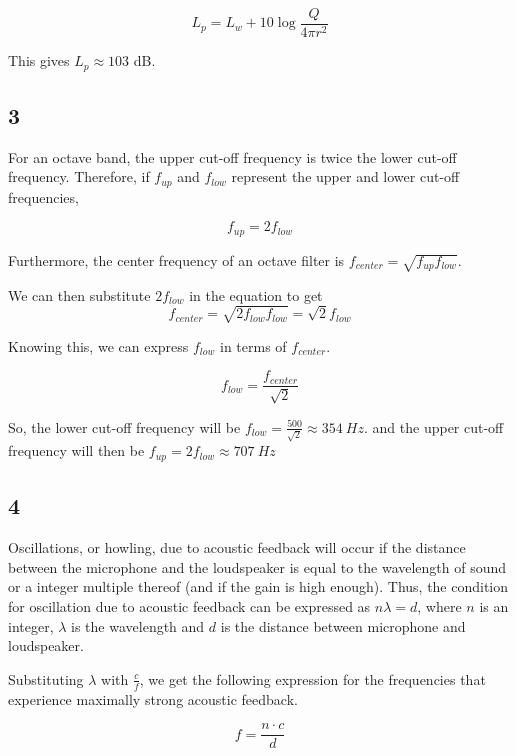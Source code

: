 \documentclass{article}
\begin{document}
\begin{equation}
    L_p = L_w + 10 \log{\frac{Q}{4 \pi r^2}}
\end{equation}

This gives $L_p \approx 103 $ dB.


\subsection*{3}

For an octave band, the upper cut-off frequency is twice the lower cut-off frequency. Therefore, if $f_{up}$ and $f_{low}$ represent the upper and lower cut-off frequencies,

\begin{equation}
    f_{up} = 2 f_{low}
\end{equation}

Furthermore, the center frequency of an octave filter is $f_{center}=\sqrt{f_{up}f_{low}}$.

We can then substitute $2f_{low}$ in the equation to get $$f_{center}=\sqrt{2f_{low}f_{low}}=\sqrt{2}f_{low}$$

Knowing this, we can express $f_{low}$ in terms of $f_{center}$.

\begin{equation}
    f_{low} = \frac{f_{center}}{\sqrt{2}}
\end{equation}

So, the lower cut-off frequency will be $f_{low}=\frac{500}{\sqrt{2}} \approx 354 \ Hz$.
and the upper cut-off frequency will then be $f_{up}=2 f_{low} \approx 707 \ Hz$


\subsection*{4}

Oscillations, or howling, due to acoustic feedback will occur if the distance between the microphone and the loudspeaker is equal to the wavelength of sound or a integer multiple thereof (and if the gain is high enough). Thus, the condition for oscillation due to acoustic feedback can be expressed as $n\lambda = d$, where $n$ is an integer, $\lambda$ is the wavelength and $d$ is the distance between microphone and loudspeaker.

Substituting $\lambda$ with $\frac{c}{f}$, we get the following expression for the frequencies that experience maximally strong acoustic feedback.

\begin{equation}
    f = \frac{n \cdot c}{d}
\end{equation}
\end{document}
